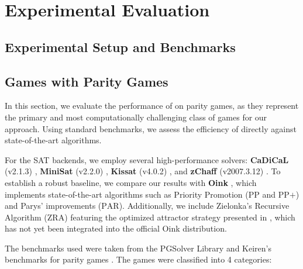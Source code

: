 \documentclass[a4paper,fleqn]{cas-sc}
\begin{document}

\section{Experimental Evaluation}\label{sec:experiments}


\subsection{Experimental Setup and Benchmarks}\label{sec:exp_setup}


\subsection{Games with Parity Games}\label{sec:exp_parity}

In this section, we evaluate the performance of \nooppc on parity games, as they represent the primary and most computationally challenging class of games for our approach. Using standard benchmarks, we assess the efficiency of \nooppc directly against state-of-the-art algorithms.


For the SAT backends, we employ several high-performance solvers: \textbf{CaDiCaL} (v2.1.3) \cite{Biere:Cadical:2024}, \textbf{MiniSat} (v2.2.0) \cite{Een:MiniSat:2003}, \textbf{Kissat} (v4.0.2) \cite{Biere:Kissat:2024}, and \textbf{zChaff} (v2007.3.12) \cite{Moskewicz:zChaff:2001}. To establish a robust baseline, we compare our results with \textbf{Oink} \cite{vanDijk:2018}, which implements state-of-the-art algorithms such as Priority Promotion ($\text{PP}$ and $\text{PP+}$) and Parys' improvements ($\text{PAR}$). Additionally, we include Zielonka's Recursive Algorithm ($\text{ZRA}$) featuring the optimized attractor strategy presented in \cite{Aggarwal:2023}, which has not yet been integrated into the official Oink distribution.

The benchmarks used were taken from the PGSolver Library \cite{Friedmann:2017} and Keiren's benchmarks for parity games \cite{Keiren:2015}. The games were classified into 4 categories:
\end{document}
